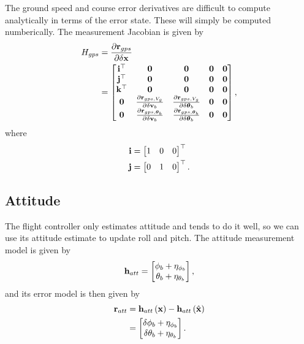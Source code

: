 \documentclass[english]{article}
\begin{document}
The ground speed and course error derivatives are difficult to compute analytically in terms of the error state. These will simply be computed numberically. The measurement Jacobian is given by
\begin{align}
H_{gps} & = \frac{\partial {\bf r}_{gps}}{\partial \delta {\bf x}} \\
& = \begin{bmatrix} {\bf i}^\top & {\bf 0} & {\bf 0} & {\bf 0} & {\bf 0} \\
{\bf j}^\top & {\bf 0} & {\bf 0} & {\bf 0} & {\bf 0} \\
{\bf k}^\top & {\bf 0} & {\bf 0} & {\bf 0} & {\bf 0} \\
{\bf 0} & \frac{\partial {\bf r}_{gps,V_g}}{\partial \delta {\bf v}_b} & \frac{\partial {\bf r}_{gps,V_g}}{\partial \delta {\boldsymbol \theta}_b} & {\bf 0} & {\bf 0} \\
{\bf 0} & \frac{\partial {\bf r}_{gps,{\boldsymbol \theta}_b}}{\partial \delta {\bf v}_b} & \frac{\partial {\bf r}_{gps,{\boldsymbol \theta}_b}}{\partial \delta {\boldsymbol \theta}_b} & {\bf 0} & {\bf 0} \end{bmatrix},
\end{align}
where
\begin{align}
{\bf i} & = \begin{bmatrix} 1 & 0 & 0 \end{bmatrix}^\top \\
{\bf j} & = \begin{bmatrix} 0 & 1 & 0 \end{bmatrix}^\top.
\end{align}

\subsection{Attitude}

The flight controller only estimates attitude and tends to do it well, so we can use its attitude estimate to update roll and pitch. The attitude measurement model is given by
\begin{equation}
{\bf h}_{att} = \begin{bmatrix} \phi_b + \eta_{\phi_b} \\ \theta_b + \eta_{\theta_b} \end{bmatrix},
\end{equation}
and its error model is then given by
\begin{align}
{\bf r}_{att} & = {\bf h}_{att}\left({\bf x}\right) - {\bf h}_{att}\left(\hat{{\bf x}}\right) \\
& = \begin{bmatrix} \delta \phi_b + \eta_{\phi_b} \\ \delta \theta_b + \eta_{\theta_b} \end{bmatrix}.
\end{align}
\end{document}
